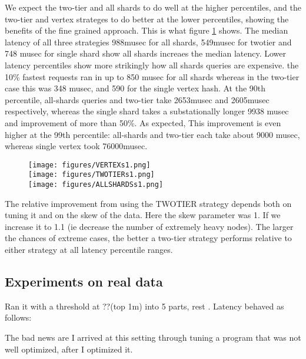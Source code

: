 We expect the two-tier and all shards to do well at the higher percentiles, and the two-tier and vertex strateges to do better at the lower percentiles, showing the benefits of the fine grained approach.  This is what figure  \ref{fig:skew1_n13}  shows. The median latency of all three strategies 988musec  for all shards, 549musec for twotier and 748 musec for single shard show all shards increaes the median latency. Lower latency percentiles show more strikingly how all shards queries are expensive. the 10\% fastest requests ran in  up to 850 musec for all shards whereas in the two-tier case this was 348 musec, and 590 for the single vertex hash.  At the 90th percentile, all-shards queries and two-tier take 2653musec and 2605musec respectively,   whereas the single shard takes a substationally longer 9938 musec and improvement of more than 50\%. As expected, This improvement is even higher at the 99th percentile: all-shards and two-tier each take about 9000 musec, whereas single vertex took 76000musec.

\begin{figure}
\texttt{[image: figures/VERTEXs1.png]}\\
\texttt{[image: figures/TWOTIERs1.png]}\\
\texttt{[image: figures/ALLSHARDSs1.png]}
\label{fig:skew1_n13}
\end{figure}


The relative improvement from using the TWOTIER strategy depends both on tuning it and on the skew of the data.  Here the skew parameter was 1. If we increase it to 1.1 (ie decrease the number of extremely heavy nodes).  The larger the chances of extreme cases, the better a two-tier strategy performs relative to either strategy at all latency percentile ranges. 

\subsection{Experiments on real data}

Ran it with a threshold at ??(top 1m) into 5 parts, rest .  Latency behaved as follows:

The bad news are I arrived at this setting through tuning a program that was not well optimized, after I optimized it.

